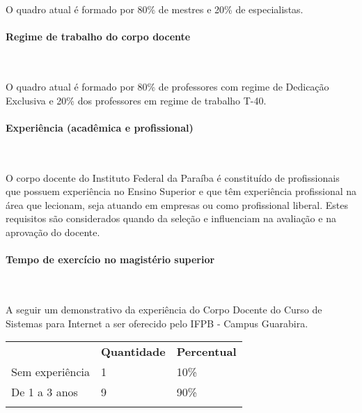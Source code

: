 	O quadro atual \'e formado por 80\% de mestres e 20\% de especialistas.

\paragraph{Regime de trabalho do corpo docente}\

	O quadro atual \'e formado por 80\% de professores com regime de Dedica\c{c}\~ao Exclusiva e 20\% dos professores em regime de trabalho T-40.

\paragraph{Experi\^encia (acad\^emica e profissional)}\

	O corpo docente do Instituto Federal da Paraíba é constituído de profissionais que possuem experiência no Ensino Superior e que têm experiência profissional na área que lecionam, seja atuando em empresas ou como profissional liberal. Estes requisitos são considerados quando da seleção e influenciam na avaliação e na aprovação do docente.

\paragraph{Tempo de exercício no magistério superior}\

A seguir um demonstrativo da experiência do Corpo Docente do Curso de Sistemas para Internet a ser oferecido pelo IFPB - Campus Guarabira.

\begin{table}[h!]
\begin{tabular}{lll}
\rowcolor[HTML]{C0C0C0} 
\multicolumn{1}{c}{\cellcolor[HTML]{C0C0C0}\textbf{Experiência no Magistério Superior}} & \multicolumn{1}{c}{\cellcolor[HTML]{C0C0C0}\textbf{Quantidade}} & \multicolumn{1}{c}{\cellcolor[HTML]{C0C0C0}\textbf{Percentual}} \\
Sem experiência                                                                         & 1                                                               & 10\%                                                            \\
De 1 a 3 anos                                                                           & 9                                                               & 90\%                                                            \\
\rowcolor[HTML]{9B9B9B} 
\multicolumn{3}{l}{\cellcolor[HTML]{9B9B9B}}                                                                                                                                                                               
\end{tabular}
\end{table}

